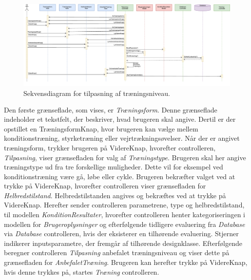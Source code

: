\begin{figure} [H]
\centering
\includegraphics[width=1.55\textwidth, angle=90]{figures/Sek/SEKTilpasning}
\caption{Sekvensdiagram for tilpasning af træningsniveau.}
\label{fig:SEKTilpasning}
\end{figure}

\noindent
Den første grænseflade, som vises, er \textit{Træningsform}. Denne grænseflade indeholder et tekstfelt, der beskriver, hvad brugeren skal angive. Dertil er der opstillet en TræningsformKnap, hvor brugeren kan vælge mellem konditionstræning, styrketræning eller vejrtrækningsøvelser. Når der er angivet træningsform, trykker brugeren på VidereKnap, hvorefter controlleren, \textit{Tilpasning}, viser grænsefladen for valg af \textit{Træningstype}. Brugeren skal her angive træningstype ud fra tre forskellige muligheder. Dette vil for eksempel ved konditionstræning være gå, løbe eller cykle. Brugeren bekræfter valget ved at trykke på VidereKnap, hvorefter controlleren viser grænsefladen for \textit{Helbredstilstand}. Helbredstilstanden angives og bekræftes ved at trykke på VidereKnap. Herefter sender controlleren parametrene, type og helbredstilstand, til modellen \textit{KonditionResultater}, hvorefter controlleren henter kategoriseringen i modellen for \textit{Brugeroplysninger} og efterfølgende tidligere evaluering fra \textit{Database} via \textit{Database} controlleren, hvis der eksisterer en tilhørende evaluering. Stjerner indikerer inputsparametre, der fremgår af tilhørende designklasse.
Efterfølgende beregner controlleren \textit{Tilpasning} anbefalet træningsniveau og viser dette på grænsefladen for \textit{AnbefaletTræning}. Brugeren kan herefter trykke på VidereKnap, hvis denne trykkes på, startes \textit{Træning} controlleren. 
